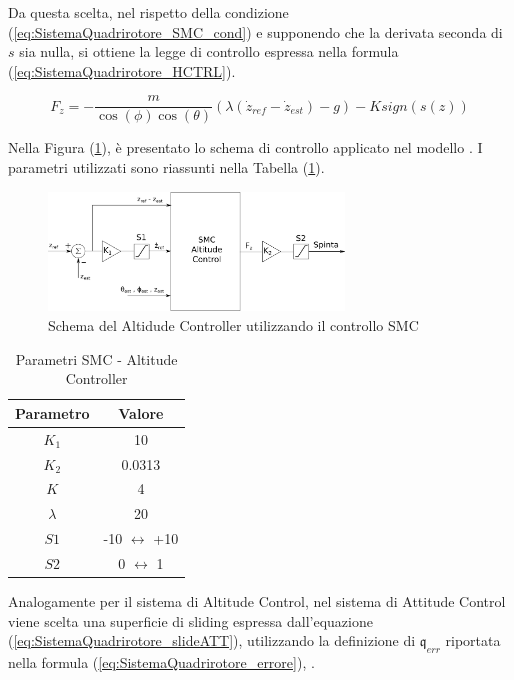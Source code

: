 Da questa scelta, nel rispetto della condizione (\ref{eq:SistemaQuadrirotore_SMC_cond}) e supponendo che la derivata seconda di $s$ sia nulla, si ottiene la legge di controllo espressa nella formula (\ref{eq:SistemaQuadrirotore_HCTRL}).

\begin{equation}\label{eq:SistemaQuadrirotore_HCTRL}
	F_z = -\frac{m}{\cos(\phi) \cos(\theta)} (\lambda (\dot{z}_{ref}-\dot{z}_{est})- g) - K \textit{sign}(s(z))
\end{equation}

Nella Figura (\ref{fig:SMC_ALT}), è presentato lo schema di controllo applicato nel modello . I parametri utilizzati sono riassunti nella Tabella (\ref{tab:ab:SMC_ALT}).

\begin{figure}
	\centering
	\includegraphics[width=0.7\textwidth]{SistemaQuadrirotore/Figure/SMCAltitudeCtrl}
	\caption{Schema del Altidude Controller utilizzando il controllo SMC}
	\label{fig:SMC_ALT}
\end{figure}

\begin{table}
	\centering
	\begin{tabular}{c c}
		\hline
		Parametro & Valore \\
		\hline
		$K_1$ & 10 \\
		$K_2$ & 0.0313\\
		$K$ & 4\\
		$\lambda$ & 20\\
		$S1$ & -10 $\leftrightarrow$ +10\\
		$S2$ & 0 $\leftrightarrow$ 1\\
		\hline
	\end{tabular}	
	\caption{Parametri SMC - Altitude Controller}
	\label{tab:ab:SMC_ALT}
\end{table}

Analogamente per il sistema di Altitude Control, nel sistema di Attitude Control viene scelta una superficie di sliding espressa dall'equazione (\ref{eq:SistemaQuadrirotore_slideATT}), utilizzando la definizione di $\mathfrak{q}_{err}$ riportata nella formula (\ref{eq:SistemaQuadrirotore_errore}), \cite{DesTestCarm}.

